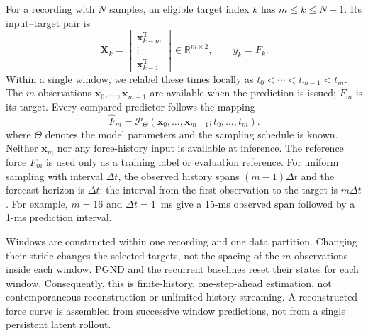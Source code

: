 \documentclass[journal,twoside]{IEEEtran}
\begin{document}
For a recording with $N$ samples, an eligible target index $k$ has
$m\leq k\leq N-1$. Its input--target pair is
\begin{equation}
    \mathbf X_k=
    \begin{bmatrix}
        \mathbf x_{k-m}^{\mathrm T}\\[-1mm]
        \vdots\\[-1mm]
        \mathbf x_{k-1}^{\mathrm T}
    \end{bmatrix}\in\mathbb R^{m\times2},
    \qquad y_k=F_k.
    \label{eq:window_pair}
\end{equation}
Within a single window, we relabel these times locally as
$t_0<\cdots<t_{m-1}<t_m$. The $m$ observations
$\mathbf x_0,\ldots,\mathbf x_{m-1}$ are available when the prediction is
issued; $F_m$ is its target. Every compared predictor follows the mapping
\begin{equation}
    \hat F_m=\mathcal P_\Theta(\mathbf x_0,\ldots,\mathbf x_{m-1};
    t_0,\ldots,t_m).
    \label{eq:discrete_mapping}
\end{equation}
where $\Theta$ denotes the model parameters and the sampling schedule is
known. Neither $\mathbf x_m$ nor any force-history input is available at
inference. The reference force $F_m$ is used only as a training label or
evaluation reference. For uniform sampling with interval $\Delta t$, the
observed history spans $(m-1)\Delta t$ and the forecast horizon is
$\Delta t$; the interval from the first observation to the target is
$m\Delta t$. For example, $m=16$ and $\Delta t=1$~ms give a 15-ms observed
span followed by a 1-ms prediction interval.

Windows are constructed within one recording and one data partition.
Changing their stride changes the selected targets, not the spacing of
the $m$ observations inside each window. PGND and the recurrent baselines
reset their states for each window. Consequently, this is finite-history,
one-step-ahead estimation, not contemporaneous reconstruction or
unlimited-history streaming. A reconstructed force curve is assembled from
successive window predictions, not from a single persistent latent rollout.
\end{document}

